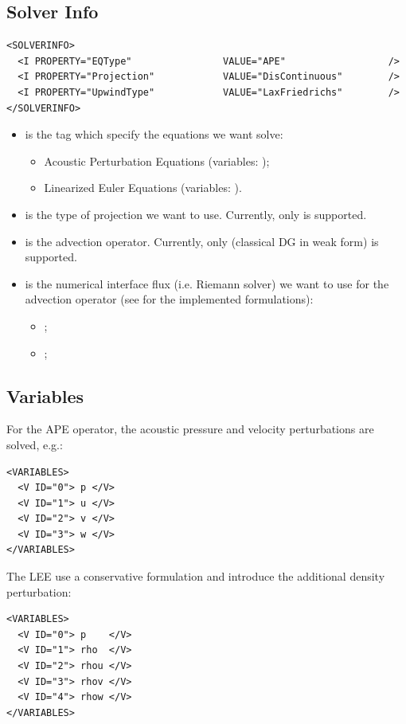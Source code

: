 \subsection{Solver Info}
\begin{lstlisting}[style=XmlStyle]
<SOLVERINFO>
  <I PROPERTY="EQType"                VALUE="APE"                  />
  <I PROPERTY="Projection"            VALUE="DisContinuous"        />
  <I PROPERTY="UpwindType"            VALUE="LaxFriedrichs"        />
</SOLVERINFO>
\end{lstlisting}
\begin{itemize}
    \item {} is the tag which specify the equations we want solve:
    \begin{itemize}
        \item {} Acoustic Perturbation Equations (variables: );
        \item {} Linearized Euler Equations (variables: ).
    \end{itemize}
    \item {} is the type of projection we want to use. Currently, only  is supported.
    \item {} is the advection operator. Currently, only  (classical DG in weak form) is supported.
    \item {} is the numerical interface flux (i.e. Riemann solver) 
    we want to use for the advection operator (see \cite{La18} for the implemented formulations):
    \begin{itemize}
        \item {};
        \item {}; 
    \end{itemize}
\end{itemize}

\subsection{Variables}
For the APE operator, the acoustic pressure and velocity perturbations are solved, e.g.:
\begin{lstlisting}[style=XmlStyle]
<VARIABLES>
  <V ID="0"> p </V>
  <V ID="1"> u </V>
  <V ID="2"> v </V>
  <V ID="3"> w </V>
</VARIABLES>
\end{lstlisting}
The LEE use a conservative formulation and introduce the additional density perturbation:
\begin{lstlisting}[style=XmlStyle]
<VARIABLES>
  <V ID="0"> p    </V>
  <V ID="1"> rho  </V>
  <V ID="2"> rhou </V>
  <V ID="3"> rhov </V>
  <V ID="4"> rhow </V>
</VARIABLES>
\end{lstlisting}


